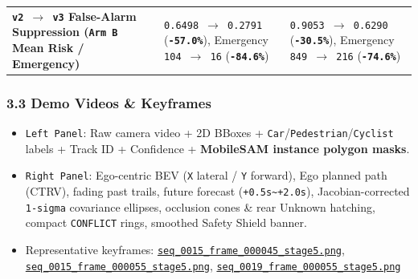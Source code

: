 \documentclass[10.5pt,a4paper]{article}
\begin{document}
\begin{footnotesize}
\begin{longtable}{>{\raggedright\arraybackslash}p{} >{\raggedright\arraybackslash}p{} >{\raggedright\arraybackslash}p{}}
\textbf{\texttt{v2 $\rightarrow$ v3} False-Alarm Suppression (\texttt{Arm B} Mean Risk / Emergency)} & \texttt{0.\allowbreak{}6498 $\rightarrow$ 0.\allowbreak{}2791} (\textbf{\texttt{-\allowbreak{}57.\allowbreak{}0\%}}), Emergency \texttt{104 $\rightarrow$ 16} (\textbf{\texttt{-\allowbreak{}84.\allowbreak{}6\%}}) & \texttt{0.\allowbreak{}9053 $\rightarrow$ 0.\allowbreak{}6290} (\textbf{\texttt{-\allowbreak{}30.\allowbreak{}5\%}}), Emergency \texttt{849 $\rightarrow$ 216} (\textbf{\texttt{-\allowbreak{}74.\allowbreak{}6\%}}) \\
\end{longtable}
\end{footnotesize}


\subsubsection{3.3 Demo Videos \& Keyframes}
\begin{itemize}[leftmargin=1.5em,itemsep=2pt]
\item \texttt{Left Panel}: Raw camera video + 2D BBoxes + \texttt{Car}/\texttt{Pedestrian}/\texttt{Cyclist} labels + Track ID + Confidence + \textbf{MobileSAM instance polygon masks}.
\item \texttt{Right Panel}: Ego-centric BEV (\texttt{X} lateral / \texttt{Y} forward), Ego planned path (CTRV), fading past trails, future forecast (\texttt{+0.\allowbreak{}5s\textasciitilde{}+2.\allowbreak{}0s}), Jacobian-corrected \texttt{1-\allowbreak{}sigma} covariance ellipses, occlusion cones \& rear Unknown hatching, compact \texttt{CONFLICT} rings, smoothed Safety Shield banner.
\item Representative keyframes: \href{https://github.com/Heisnotanimposter/Totalcare\_autonomous\_driving\_Yolov5/blob/main/results/v3\_bev\_fixed/world\_outputs/world\_model\_0015\_staged/keyframes/seq\_0015\_frame\_000045\_stage5.png}{\texttt{seq\_\allowbreak{}0015\_\allowbreak{}frame\_\allowbreak{}000045\_\allowbreak{}stage5.\allowbreak{}png}}, \href{https://github.com/Heisnotanimposter/Totalcare\_autonomous\_driving\_Yolov5/blob/main/results/v3\_bev\_fixed/world\_outputs/world\_model\_0015\_staged/keyframes/seq\_0015\_frame\_000055\_stage5.png}{\texttt{seq\_\allowbreak{}0015\_\allowbreak{}frame\_\allowbreak{}000055\_\allowbreak{}stage5.\allowbreak{}png}}, \href{https://github.com/Heisnotanimposter/Totalcare\_autonomous\_driving\_Yolov5/blob/main/results/v3\_bev\_fixed/world\_outputs/world\_model\_0019\_staged/keyframes/seq\_0019\_frame\_000055\_stage5.png}{\texttt{seq\_\allowbreak{}0019\_\allowbreak{}frame\_\allowbreak{}000055\_\allowbreak{}stage5.\allowbreak{}png}}
\end{itemize}
\end{document}
